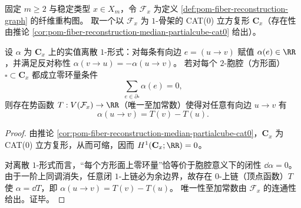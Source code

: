 \begin{theorem}\label{thm:pom-fiber-cubical-poincare-stokes-lemma}
固定 \(m\ge 2\) 与稳定类型 \(x\in X_m\)，令 \(\mathcal F_x\) 为定义 \ref{def:pom-fiber-reconstruction-graph} 的纤维重构图。
取一个以 \(\mathcal F_x\) 为 \(1\)-骨架的 CAT(0) 立方复形 \(\mathbf C_x\)（存在性由推论 \ref{cor:pom-fiber-reconstruction-median-partialcube-cat0} 给出）。
\par
设 \(\alpha\) 为 \(\mathbf C_x\) 上的实值离散 \(1\)-形式：对每条有向边 \(e=(u\to v)\) 赋值 \(\alpha(e)\in\RR\)，并满足反对称性 \(\alpha(v\to u)=-\alpha(u\to v)\)。
若对每个 \(2\)-胞腔（方形面） \(\square\subset \mathbf C_x\) 都成立零环量条件
\[
\sum_{e\in\partial\square}\alpha(e)=0,
\]
则存在势函数 \(T:V(\mathcal F_x)\to\RR\)（唯一至加常数）使得对任意有向边 \(u\to v\) 有
\[
\boxed{\;\alpha(u\to v)=T(v)-T(u).\;}
\]
\end{theorem}
\begin{proof}
由推论 \ref{cor:pom-fiber-reconstruction-median-partialcube-cat0}，\(\mathbf C_x\) 为 CAT(0) 立方复形，从而可缩，因而 \(H^1(\mathbf C_x;\RR)=0\)。
\par
对离散 \(1\)-形式而言，“每个方形面上零环量”恰等价于胞腔意义下的闭性 \(\dd\alpha=0\)。
由于一阶上同调消失，任意闭 \(1\)-上链必为余边界，故存在 \(0\)-上链（顶点函数）\(T\) 使 \(\alpha=\dd T\)，即 \(\alpha(u\to v)=T(v)-T(u)\)。
唯一性至加常数由 \(\mathcal F_x\) 的连通性给出。证毕。
\end{proof}

